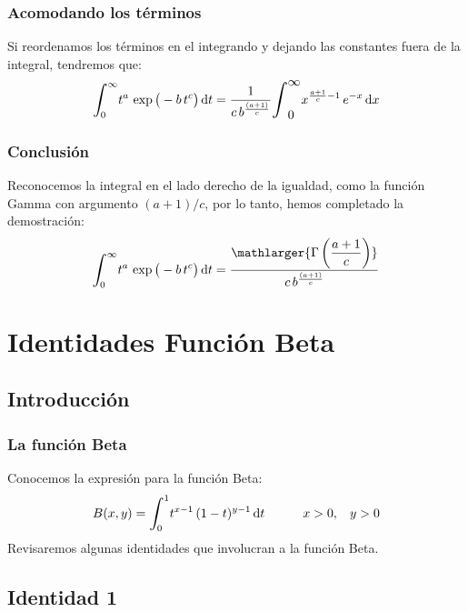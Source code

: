 \documentclass[12pt]{beamer}
\begin{document}
\begin{frame}
\frametitle{Acomodando los términos}
Si reordenamos los términos en el integrando y dejando las constantes fuera de la integral, tendremos que:
\pause
\begin{align*}
\scaleint{6ex}_{\bs 0}^{\infty} t^{a} \, \exp \big( -b \, t^{c} \big) \dd{t} = \dfrac{1}{c \, b^{\frac{(a+1)}{c}}} \scaleto{\scaleint{6ex}_{\text{\small{0}}}^{\text{\small{$\infty$}}}}{30pt} x^{\frac{a+1}{c} - 1} \, e^{-x} \dd{x}
\end{align*}
\end{frame}
\begin{frame}
\frametitle{Conclusión}
Reconocemos la integral en el lado derecho de la igualdad, como la función Gamma con argumento $(a+1)/c$, por lo tanto, hemos completado la demostración:
\pause
\begin{align*}
\scaleint{6ex}_{\bs 0}^{\infty} t^{a} \, \exp \big( -b \, t^{c} \big) \dd{t} = \dfrac{\mathlarger{\Gamma \left( \dfrac{a + 1}{c} \right)}}{c \, b^{\frac{(a+1)}{c}}} 
\end{align*}
\end{frame}

\section{Identidades Función Beta}
\subsection{Introducción}

\begin{frame}
\frametitle{La función Beta}
Conocemos la expresión para la función Beta:
\pause
\begin{align*}
B(x, y) = \scaleint{6ex}_{\bs 0}^{1} t^{x-1} \, (1 - t)^{y-1} \dd{t} \hspace{1cm} x > 0, \hspace{0.3cm} y > 0
\end{align*}
\pause
Revisaremos algunas identidades que involucran a la función Beta.
\end{frame}

\subsection{Identidad 1}
\end{document}
